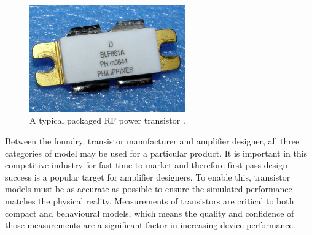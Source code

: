 \documentclass[../thesis/thesis.tex]{subfiles}
\begin{document}
\begin{refsection}
\begin{figure}
	\centering
	\includegraphics[width=0.6\textwidth]{ch1_rfpa}
	\caption{A typical packaged RF power transistor \cite{blf861a}.}
	\label{ch1_fig_rfpa}
\end{figure}

Between the foundry, transistor manufacturer and amplifier designer, all three categories of model may be used for a particular product. It is important in this competitive industry for fast time-to-market and therefore first-pass design success is a popular target for amplifier designers. To enable this, transistor models must be as accurate as possible to ensure the simulated performance matches the physical reality. Measurements of transistors are critical to both compact and behavioural models, which means the quality and confidence of those measurements are a significant factor in increasing device performance.


\end{refsection}
\end{document}
